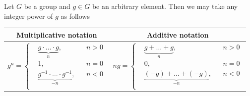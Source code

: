 Let $G$ be a group and $g\in G$ be an arbitrary element.
Then we may take any integer power of $g$ as follows
\begin{center}
\begin{tabular}{c | c}
{Multiplicative notation}&{Additive notation}\\
\hline
{
$
g^n =
\left\{
\begin{aligned}
&\underbrace{g\cdot \ldots \cdot g}_n,&&n>0\\
&1,&&n=0\\
&\underbrace{g^{-1}\cdot \ldots \cdot g^{-1}}_{-n},&&n<0\\
\end{aligned}
\right.
$
}&{
$
n g =
\left\{
\begin{aligned}
&\underbrace{g+ \ldots + g}_n,&&n>0\\
&0,&&n=0\\
&\underbrace{(-g) + \ldots +(- g)}_{-n},&&n<0\\
\end{aligned}
\right.
$
}\\
\end{tabular}
\end{center}

